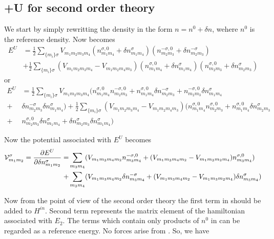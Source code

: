 \subsection{+U for second order theory}
\par{We start by simply rewritting the density in the form $n=n^0+\delta n$, wehere $n^0$ is the reference density.
Now  becomes}
\begin{equation}
\begin{split}
E^U&=\frac{1}{2}\sum_{\{m_i\}\sigma}V_{m_1m_2m_3m_4}(n_{m_1m_4}^{\sigma, 0}+\delta n_{m_1m_4}^{\sigma})(n_{m_2m_3}^{-\sigma,0}+\delta n_{m_2m_3}^{-\sigma})\\&+
\frac{1}{2}\sum_{\{m_i\}\sigma}(V_{m_1m_2m_3m_4}-V_{m_1m_2m_4m_3})
(n_{m_1m_4}^{\sigma,0}+\delta n_{m_1m_4}^{\sigma})(n_{m_2m_3}^{\sigma,0}+\delta n_{m_2m_3}^{\sigma})
\end{split}
\end{equation}
or
\begin{equation}
\label{eu2}
\begin{split}
E^U&=\frac{1}{2}\sum_{\{m_i\}\sigma}V_{m_1m_2m_3m_4}( n_{m_1m_4}^{\sigma, 0}n_{m_2m_3}^{-\sigma,0}+n_{m_1m_4}^{\sigma, 0}\delta n_{m_2m_3}^{-\sigma}
+ n_{m_2m_3}^{-\sigma,0}\delta n_{m_1m_4}^{\sigma}\\+& \delta n_{m_2m_3}^{-\sigma}\delta n_{m_1m_4}^{\sigma})+
\frac{1}{2}\sum_{\{m_i\}\sigma}(V_{m_1m_2m_3m_4}-V_{m_1m_2m_4m_3})
(n_{m_1m_4}^{\sigma, 0}n_{m_2m_3}^{\sigma,0}+n_{m_1m_4}^{\sigma, 0}\delta n_{m_2m_3}^{\sigma}
\\+& n_{m_2m_3}^{\sigma,0}\delta n_{m_1m_4}^{\sigma}+ \delta n_{m_2m_3}^{\sigma}\delta n_{m_1m_4}^{\sigma})
\end{split}
\end{equation}
\par{Now the potential associated with $E^U$ becomes}
%
\begin{equation}
\label{hamU}
\begin{split}
\mathcal{V}_{m_1m_2}^{\sigma}=\frac{\partial E^U}{\partial \delta n_{m_1m_2}^{\sigma}}=&\sum_{m_3m_4}(V_{m_1m_3m_4m_2}
n_{m_3m_4}^{-\sigma,0}+(V_{m_1m_3m_4m_2}-V_{m_1m_3m_2m_4})n_{m_3m_4}^{\sigma,0})\\
+&\sum_{m_3m_4}(V_{m_1m_3m_4m_2}
\delta n_{m_3m_4}^{-\sigma}+(V_{m_1m_3m_4m_2}-V_{m_1m_3m_2m_4})\delta n_{m_3m_4}^{\sigma})
\end{split}
\end{equation}
%
\par{Now from the point of view of the second order theory the first term in  should be added to $H^{in}$.
Second term represents the matrix element of the hamiltonian
associated with $E_2$. The terms which contain only products of $n^0$ in  can be regarded as a reference energy. No forces arise from . So, we have}
